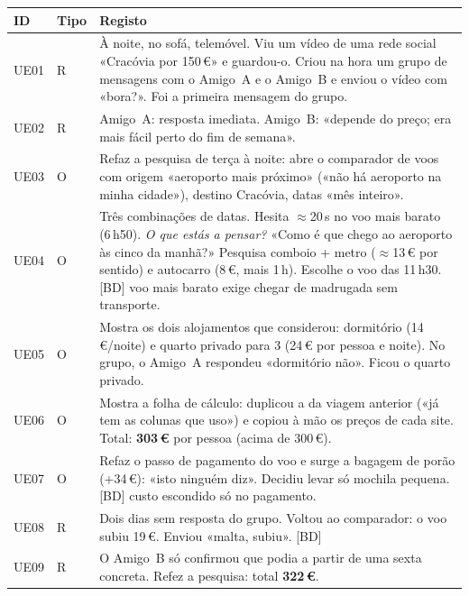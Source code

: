 \documentclass[11pt,a4paper]{article}
\newcommand{\bolt}{\textcolor{alerta}{[BD]}}
\begin{document}
{\small
\begin{longtable}{@{}p{1.1cm}p{0.7cm}p{13.4cm}@{}}
\toprule
\textbf{ID} & \textbf{Tipo} & \textbf{Registo} \\ \midrule \endhead
UE01 & R & À noite, no sofá, telemóvel. Viu um vídeo de uma rede social «Cracóvia 
por 150\,€» e guardou-o. Criou na hora um grupo de mensagens com o Amigo~A e o 
Amigo~B e enviou o vídeo com «bora?». Foi a primeira mensagem do grupo. \\

UE02 & R & Amigo~A: resposta imediata. Amigo~B: «depende
do preço; era mais fácil perto do fim de semana». \\

UE03 & O & Refaz a pesquisa de terça à noite: abre o comparador de voos com 
origem «aeroporto mais próximo» («não há aeroporto na minha cidade»), destino 
Cracóvia, datas «mês inteiro». \\

UE04 & O & Três combinações de datas. Hesita \(\approx\)20\,s no voo mais 
barato (6\,h50). \emph{O que estás a pensar?} «Como é que chego ao aeroporto às 
cinco da manhã?» Pesquisa comboio + metro (\(\approx\)13\,€ por sentido) e 
autocarro (8\,€, mais 1\,h). Escolhe o voo das 11\,h30. \bolt{} voo mais barato 
exige chegar de madrugada sem transporte. \\

UE05 & O & Mostra os dois alojamentos que considerou: dormitório (14\,€/noite) e 
quarto privado para 3 (24\,€ por pessoa e noite). No grupo, o Amigo~A respondeu 
«dormitório não». Ficou o quarto privado. \\

UE06 & O & Mostra a folha de cálculo: duplicou a da viagem anterior («já tem as 
colunas que uso») e copiou à mão os preços de cada site. Total: \textbf{303\,€} 
por pessoa (acima de 300\,€). \\

UE07 & O & Refaz o passo de pagamento do voo e surge a bagagem de porão (+34\,€): 
«isto ninguém diz». Decidiu levar só mochila pequena. \bolt{} custo escondido só 
no pagamento. \\

UE08 & R & Dois dias sem resposta do grupo. Voltou ao comparador: o voo subiu 19\,€. 
Enviou «malta, subiu». \bolt{} \\

UE09 & R & O Amigo~B só confirmou que podia a partir de uma sexta concreta. Refez a 
pesquisa: total \textbf{322\,€}. \\


\end{longtable}}
\end{document}
